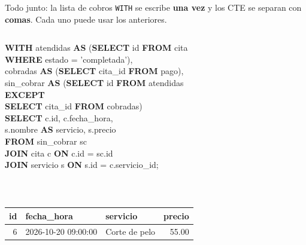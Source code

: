 \documentclass[aspectratio=169,10pt,c]{beamer}
\newcommand{\kw}[1]{\textcolor{utpRojo}{\textbf{#1}}}
\newcommand{\npieza}[1]{\tikz[baseline=-0.6ex]{\node[circle,fill=utpRojo,text=white,
  font=\bfseries\scriptsize,inner sep=1.6pt,minimum size=4.2mm] {#1};}}
\newenvironment{sqlcode}[1][.86\textwidth]
  {\begin{center}\begin{lrbox}{\sqlbuf}\begin{minipage}{#1}\ttfamily\footnotesize\vspace{6pt}\raggedright}
  {\vspace{6pt}\end{minipage}\end{lrbox}\colorbox{utpGrisClaro}{\usebox{\sqlbuf}}\end{center}}
\newcommand{\ind}{\hspace*{1.6em}}
\newcommand{\cab}[1]{\normalfont\bfseries #1}
\newcommand{\res}[3]{%
  \centering{\scriptsize\color{utpGris}resultado}\\[3pt]
  \footnotesize\ttfamily
  \begin{tabular}{#1}
  \toprule
  #2 \\
  \midrule
  #3
  \bottomrule
  \end{tabular}}
\newcommand{\resg}[3]{{\res{#1}{#2}{#3}\par}}
\begin{document}
\begin{frame}{Todo junto: la lista de cobros}
\small \texttt{WITH} se escribe \textbf{una vez} y los CTE se separan con \textbf{comas}. Cada uno puede usar los anteriores.
\begin{columns}[c,onlytextwidth]
\begin{sqlcode}[\dimexpr\textwidth-2\fboxsep\relax]
\kw{WITH} atendidas \kw{AS} (\kw{SELECT} id \kw{FROM} cita\\
\ind\ind\ind\ind\kw{WHERE} estado = 'completada'),\\
cobradas \kw{AS} (\kw{SELECT} cita\_id \kw{FROM} pago),\\
sin\_cobrar \kw{AS} (\kw{SELECT} id \kw{FROM} atendidas\\
\ind\ind\ind\ind\kw{EXCEPT}\\
\ind\ind\ind\ind\kw{SELECT} cita\_id \kw{FROM} cobradas)\\
\kw{SELECT} c.id, c.fecha\_hora,\\
\ind s.nombre \kw{AS} servicio, s.precio\\
\kw{FROM} sin\_cobrar sc\\
\kw{JOIN} cita c \kw{ON} c.id = sc.id\\
\kw{JOIN} servicio s \kw{ON} s.id = c.servicio\_id;
\end{sqlcode}
\end{columns}
\vspace{0.1cm}
\resg{rllr}{\cab{id} & \cab{fecha\_hora} & \cab{servicio} & \cab{precio}}{6 & 2026-10-20 09:00:00 & Corte de pelo & 55.00 \\}
\end{frame}
\end{document}
